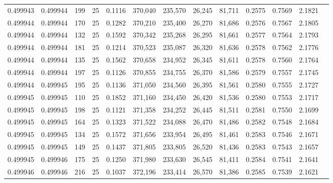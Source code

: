 \begin{tabular}{rrrrrrrrrrrrr}
0.499943 & 0.499944 &   199 &  25 &                                     0.1116 & 370,040 & 235,570 &  26,245 &  81,711 & 0.2575 & 0.7569 & 2.1821 \\
0.499944 & 0.499944 &   170 &  25 &                                     0.1282 & 370,210 & 235,400 &  26,270 &  81,686 & 0.2576 & 0.7567 & 2.1805 \\
0.499944 & 0.499944 &   132 &  25 &                                     0.1592 & 370,342 & 235,268 &  26,295 &  81,661 & 0.2577 & 0.7564 & 2.1793 \\
0.499944 & 0.499944 &   181 &  25 &                                     0.1214 & 370,523 & 235,087 &  26,320 &  81,636 & 0.2578 & 0.7562 & 2.1776 \\
0.499944 & 0.499944 &   135 &  25 &                                     0.1562 & 370,658 & 234,952 &  26,345 &  81,611 & 0.2578 & 0.7560 & 2.1764 \\
0.499944 & 0.499944 &   197 &  25 &                                     0.1126 & 370,855 & 234,755 &  26,370 &  81,586 & 0.2579 & 0.7557 & 2.1745 \\
0.499944 & 0.499945 &   195 &  25 &                                     0.1136 & 371,050 & 234,560 &  26,395 &  81,561 & 0.2580 & 0.7555 & 2.1727 \\
0.499945 & 0.499945 &   110 &  25 &                                     0.1852 & 371,160 & 234,450 &  26,420 &  81,536 & 0.2580 & 0.7553 & 2.1717 \\
0.499945 & 0.499945 &   198 &  25 &                                     0.1121 & 371,358 & 234,252 &  26,445 &  81,511 & 0.2581 & 0.7550 & 2.1699 \\
0.499945 & 0.499945 &   164 &  25 &                                     0.1323 & 371,522 & 234,088 &  26,470 &  81,486 & 0.2582 & 0.7548 & 2.1684 \\
0.499945 & 0.499945 &   134 &  25 &                                     0.1572 & 371,656 & 233,954 &  26,495 &  81,461 & 0.2583 & 0.7546 & 2.1671 \\
0.499945 & 0.499945 &   149 &  25 &                                     0.1437 & 371,805 & 233,805 &  26,520 &  81,436 & 0.2583 & 0.7543 & 2.1657 \\
0.499945 & 0.499946 &   175 &  25 &                                     0.1250 & 371,980 & 233,630 &  26,545 &  81,411 & 0.2584 & 0.7541 & 2.1641 \\
0.499946 & 0.499946 &   216 &  25 &                                     0.1037 & 372,196 & 233,414 &  26,570 &  81,386 & 0.2585 & 0.7539 & 2.1621 \\

\end{tabular}
